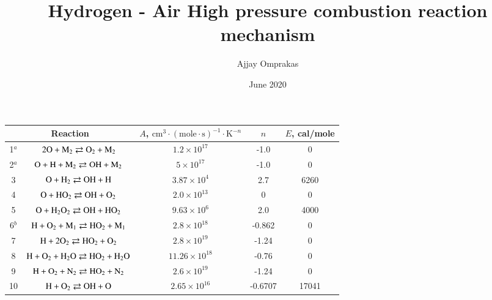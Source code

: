 \documentclass{warpdoc}
\author{
  Ajjay Omprakas 
}
\title{Hydrogen - Air High pressure combustion reaction mechanism
}
\date{
  June 2020
}
\renewcommand{\fontsizetable}{\footnotesize\scalefont{0.9}}
\begin{document}
  \pagestyle{headings}
  \setcounter{page}{1}
  \makewarpdoctitle









%
\begin{table}[t]
\fontsizetable
\begin{center}
\begin{threeparttable}
\begin{tabular}{ccccc} 
\toprule
\multicolumn{2}{c}{Reaction} & $A$, $\textrm{cm}^3\cdot(\textrm{mole}\cdot \textrm{s})^{-1}\cdot \textrm{K}^{-n}$ & $n$ & $E$, cal/mole  \\ 
\midrule
    1$^a$ & $\rm 2O + M_2 \rightleftarrows  O_2 + M_2$&$1.2 \times 10^{17}$& -1.0 &  0\\
    2$^a$ & $\rm O +  H + M_2 \rightleftarrows  OH + M_2$  & $ 5 \times 10^{17} $& -1.0 &  0\\
    3& $\rm O +  H_2  \rightleftarrows  OH + H$  & $ 3.87 \times 10^{4} $& 2.7 & 6260 \\
    4 & $\rm O +  HO_2  \rightleftarrows  OH + O_2$  & $ 2.0 \times 10^{13} $& 0 & 0 \\
    5 & $\rm O +  H_2O_2  \rightleftarrows  OH + HO_2$  & $ 9.63 \times 10^{6} $& 2.0 & 4000  \\
    6$^b$ & $\rm H + O_2 + M_1  \rightleftarrows  HO_2 + M_1$  & $ 2.8 \times 10^{18} $& -0.862 & 0 \\
    7 & $\rm H + 2O_2  \rightleftarrows  HO_2 + O_2$  & $ 2.8 \times 10^{19} $& -1.24 & 0 \\
    8 & $\rm H + O_2 + H_2O  \rightleftarrows  HO_2 + H_2O$  & $ 11.26 \times 10^{18} $& -0.76 & 0 \\
    9 & $\rm H + O_2 + N_2  \rightleftarrows  HO_2 + N_2$  & $ 2.6 \times 10^{19} $& -1.24 & 0 \\
    10 & $\rm H + O_2 \rightleftarrows  OH + O$  & $ 2.65 \times 10^{16} $& -0.6707 & 17041 \\

\end{tabular}
\end{threeparttable}
\end{center}
\end{table}
\end{document}
